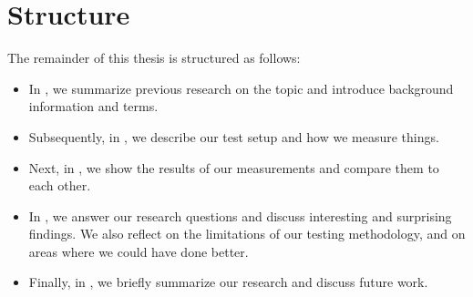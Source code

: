 \section{Structure}
The remainder of this thesis is structured as follows:
\begin{itemize}
  \item In , we summarize previous research on the topic and introduce background information and terms.
  \item Subsequently, in , we describe our test setup and how we measure things.
  \item Next, in , we show the results of our measurements and compare them to each other.
  \item In , we answer our research questions and discuss interesting and surprising findings.
  We also reflect on the limitations of our testing methodology, and on areas where we could have done better.
  \item Finally, in , we briefly summarize our research and discuss future work.
\end{itemize}


